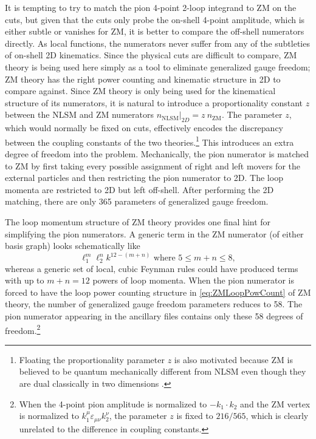 \documentclass[11pt,letter]{article}
\begin{document}
It is tempting to try to match the pion 4-point 2-loop integrand to ZM on the cuts, but given that the cuts only probe the on-shell 4-point amplitude, which is either subtle or vanishes for ZM, it is better to compare the off-shell numerators directly.
As local functions, the numerators never suffer from any of the subtleties of on-shell 2D kinematics.
Since the physical cuts are difficult to compare, ZM theory is being used here simply as a tool to eliminate generalized gauge freedom; ZM theory has the right power counting and kinematic structure in 2D to compare against.
Since ZM theory is only being used for the kinematical structure of its numerators, it is natural to introduce a proportionality constant $z$ between the NLSM and ZM numerators $n_\text{NLSM} \vert_{2D} = z ~ n_\text{ZM}$.
The parameter $z$, which would normally be fixed on cuts, effectively encodes the discrepancy between the coupling constants of the two theories.\footnote{Floating the proportionality parameter $z$ is also motivated because ZM is believed to be quantum mechanically different from NLSM even though they are dual classically in two dimensions \cite{Nappi:1979ig}.}
This introduces an extra degree of freedom into the problem.
Mechanically, the pion numerator is matched to ZM by first taking every possible assignment of right and left movers for the external particles and then restricting the pion numerator to 2D.
The loop momenta are restricted to 2D but left off-shell.
After performing the 2D matching, there are only 365 parameters of generalized gauge freedom.

The loop momentum structure of ZM theory provides one final hint for simplifying the pion numerators.
A generic term in the ZM numerator (of either basis graph) looks schematically like
\begin{equation}
\label{eq:ZMLoopPowCount}
\ell_1^m \ell_2^n k^{12-(m+n)} \text{ where } 5 \leq m+n \leq 8,
\end{equation}
whereas a generic set of local, cubic Feynman rules could have produced terms with up to $m+n=12$ powers of loop momenta.
When the pion numerator is forced to have the loop power counting structure in \cref{eq:ZMLoopPowCount} of ZM theory, the number of generalized gauge freedom parameters reduces to 58.
The pion numerator appearing in the ancillary files contains only these 58 degrees of freedom.\footnote{When the 4-point pion amplitude is normalized to $-k_1\cdot k_2$ and the ZM vertex is normalized to $k_1^\mu \varepsilon_{\mu\nu}k_2^\nu$, the parameter $z$ is fixed to $216/565$, which is clearly unrelated to the difference in coupling constants.}
\end{document}
